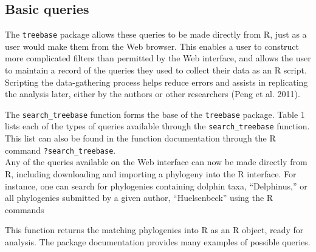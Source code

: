 \subsection{Basic queries}

The \texttt{treebase} package allows these queries to be made directly
from R, just as a user would make them from the Web browser. This
enables a user to construct more complicated filters than permitted by
the Web interface, and allows the user to maintain a record of the
queries they used to collect their data as an R script. Scripting the
data-gathering process helps reduce errors and assists in replicating
the analysis later, either by the authors or other researchers (Peng et
al. 2011).

The \texttt{search\_treebase} function forms the base of the
\texttt{treebase} package. Table 1 lists each of the types of queries
available through the \texttt{search\_treebase} function. This list can
also be found in the function documentation through the R command
\texttt{?search\_treebase}.\\Any of the queries available on the Web
interface can now be made directly from R, including downloading and
importing a phylogeny into the R interface. For instance, one can search
for phylogenies containing dolphin taxa, ``Delphinus,'' or all
phylogenies submitted by a given author, ``Huelsenbeck'' using the R
commands

\begin{Shaded}
\begin{Highlighting}[]
    \NormalTok{(}\NormalTok{, }\NormalTok{)}
    \NormalTok{(}\NormalTok{, }\NormalTok{)}
\end{Highlighting}
\end{Shaded}
This function returns the matching phylogenies into R as an R object,
ready for analysis. The package documentation provides many examples of
possible queries.

